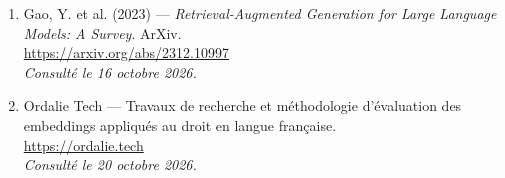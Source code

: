 \begin{enumerate}
  \item Gao, Y. et al. (2023) — \textit{Retrieval-Augmented Generation for Large Language Models: A Survey}. ArXiv.\\
        \url{https://arxiv.org/abs/2312.10997}\\
        \textit{Consulté le 16 octobre 2026.}

  \item Ordalie Tech — Travaux de recherche et méthodologie d'évaluation des embeddings appliqués au droit en langue française.\\
        \url{https://ordalie.tech}\\
        \textit{Consulté le 20 octobre 2026.}


\end{enumerate}